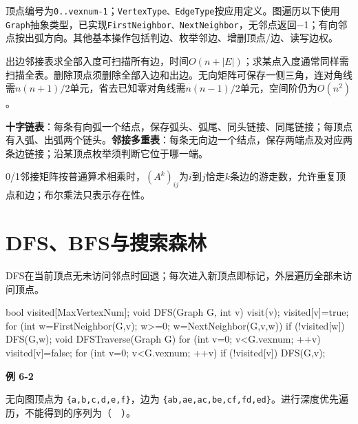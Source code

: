 顶点编号为\texttt{0.\allowbreak{}.\allowbreak{}vexnum-1}；\texttt{VertexType、EdgeType}按应用定义。图遍历以下使用\texttt{Graph}抽象类型，已实现\texttt{FirstNeighbor、NextNeighbor}，无邻点返回\ensuremath{-}1；有向邻点按出弧方向。其他基本操作包括判边、枚举邻边、增删顶点/边、读写边权。

出边邻接表求全部入度可扫描所有边，时间\(O(n+|E|)\)；求某点入度通常同样需扫描全表。删除顶点须删除全部入边和出边。无向矩阵可保存一侧三角，连对角线需\(n(n+1)/2\)单元，省去已知零对角线需\(n(n-1)/2\)单元，空间阶仍为\(O(n^2)\)。

\textbf{十字链表}：每条有向弧一个结点，保存弧头、弧尾、同头链接、同尾链接；每顶点有入弧、出弧两个链头。\textbf{邻接多重表}：每条无向边一个结点，保存两端点及对应两条边链接；沿某顶点枚举须判断它位于哪一端。

0/1邻接矩阵按普通算术相乘时，\((A^k)_{ij}\)为\(i\)到\(j\)恰走\(k\)条边的游走数，允许重复顶点和边；布尔乘法只表示存在性。

\section{DFS、BFS与搜索森林}\label{DS06-traversal}

DFS在当前顶点无未访问邻点时回退；每次进入新顶点即标记，外层遍历全部未访问顶点。

\par\smallskip\noindent\begin{minipage}{\linewidth}
\begin{codeblock}[language={C++}]
bool visited[MaxVertexNum];
void DFS(Graph G, int v) {
    visit(v);
    visited[v]=true;
    for (int w=FirstNeighbor(G,v); w>=0;
         w=NextNeighbor(G,v,w))
        if (!visited[w]) DFS(G,w);
}
void DFSTraverse(Graph G) {
    for (int v=0; v<G.vexnum; ++v) visited[v]=false;
    for (int v=0; v<G.vexnum; ++v)
        if (!visited[v]) DFS(G,v);
}
\end{codeblock}
\end{minipage}\par\smallskip

\par\medskip{}\noindent\hypertarget{DS06-E02}{}\label{DS06-E02}\textbf{例 6-2}\par\nobreak\smallskip

无向图顶点为 \texttt{\{a,\allowbreak{}b,\allowbreak{}c,\allowbreak{}d,\allowbreak{}e,\allowbreak{}f\}}，边为 \texttt{\{ab,\allowbreak{}ae,\allowbreak{}ac,\allowbreak{}be,\allowbreak{}cf,\allowbreak{}fd,\allowbreak{}ed\}}。进行深度优先遍历，不能得到的序列为（　）。

